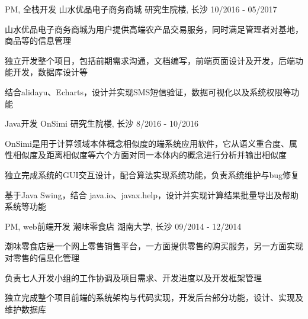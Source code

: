 \begin{cventries}
{\begin{cvitems}
      \end{cvitems}
    }
  \cventry
    {PM, 全栈开发}
    {山水优品电子商务商城}
    {研究生院楼, 长沙}
    {10/2016 - 05/2017}
    {
      \begin{cvitems}
        \item {山水优品电子商务商城为用户提供高端农产品交易服务，同时满足管理者对基地，商品等的信息管理}
        \item {独立开发整个项目，包括前期需求沟通，文档编写，前端页面设计及开发，后端功能开发，数据库设计等}
        \item {结合alidayu、Echarts，设计并实现SMS短信验证，数据可视化以及系统权限等功能}
      \end{cvitems}
    }
  \cventry
    {Java开发}
    {OnSimi}
    {研究生院楼, 长沙}
    {8/2016 - 10/2016}
    {
      \begin{cvitems}
        \item {OnSimi是用于计算领域本体概念相似度的端系统应用软件，它从语义重合度、属性相似度及距离相似度等六个方面对同一本体内的概念进行分析并输出相似度}
        \item {独立完成系统的GUI交互设计，配合算法实现系统功能，负责系统维护与bug修复}
        \item {基于Java Swing，结合 java.io、javax.help，设计并实现计算结果批量导出及帮助系统等功能}
      \end{cvitems}
    }
  \cventry
    {PM, web前端开发}
    {潮味零食店}
    {湖南大学, 长沙}
    {09/2014 - 12/2014}
    {
      \begin{cvitems}
        \item {潮味零食店是一个网上零售销售平台，一方面提供零售的购买服务，另一方面实现对零售的信息化管理}
        \item {负责七人开发小组的工作协调及项目需求、开发进度以及开发框架管理}
        \item {独立完成整个项目前端的系统架构与代码实现，开发后台部分功能，设计、实现及维护数据库}
      \end{cvitems}
    }
\end{cventries}
